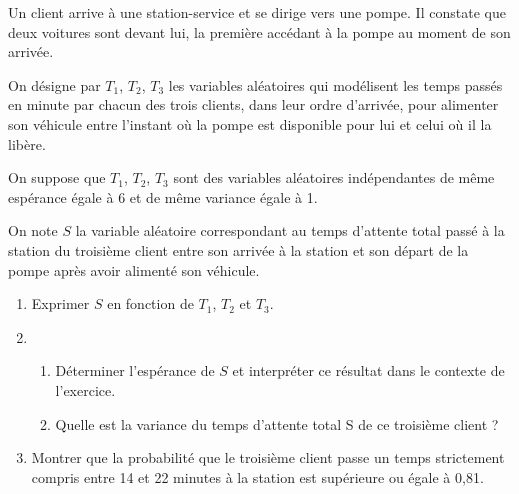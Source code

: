\documentclass[11pt,fleqn, openany]{book} %
\begin{document}
\begin{exercise}[topic=lgn03, subtitle={(Métropole 2024, Jour 1 Bis)}]

Un client arrive à une station-service et se dirige vers une pompe. Il constate que deux voitures sont
devant lui, la première accédant à la pompe au moment de son arrivée.

On désigne par $T_1$, $T_2$, $T_3$ les variables aléatoires qui modélisent les temps passés en minute par chacun des trois clients, dans leur ordre d'arrivée, pour alimenter son véhicule entre l'instant où la pompe est disponible pour lui et celui où il la libère.

On suppose que $T_1$, $T_2$, $T_3$ sont des variables aléatoires indépendantes de même espérance égale à 6 et de même variance égale à 1.

On note $S$ la variable aléatoire correspondant au temps d'attente total passé à la station du troisième client entre son arrivée à la station et son départ de la pompe après avoir alimenté son véhicule.
\begin{enumerate}
\item Exprimer $S$ en fonction de $T_1$, $T_2$ et $T_3$.
\item \begin{enumerate}
\item Déterminer l'espérance de $S$ et interpréter ce résultat dans le contexte de l'exercice.
\item Quelle est la variance du temps d'attente total S de ce troisième client ?\end{enumerate}
\item Montrer que la probabilité que le troisième client passe un temps strictement compris entre 14 et 22 minutes à la station est supérieure ou égale à 0,81.
\end{enumerate}
\end{exercise}
\end{document}
